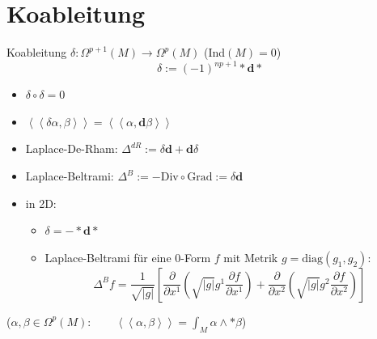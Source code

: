\documentclass{beamer}
\renewcommand{\d}{\textbf{d}}
\newcommand{\ablx}[2]{\frac{\partial #1}{\partial x^{#2}}}
\begin{document}
  
  
  \section{Koableitung}

  \begin{frame}
    \begin{block}{Koableitung \( \delta: \Omega^{p+1}(M) \longrightarrow \Omega^{p}(M) \) \qquad (Ind\( (M)=0 \))}
      \[ \delta := (-1)^{np+1} * \d * \]
      \begin{itemize}
        \item \( \delta\circ\delta = 0 \)
        \item \( \left\langle\left\langle \delta\alpha , \beta \right\rangle\right\rangle = \left\langle\left\langle \alpha , \d\beta \right\rangle\right\rangle \)
        \item Laplace-De-Rham: \( \Delta^{dR} := \delta\d + \d\delta \)
        \item Laplace-Beltrami: \( \Delta^{B} := -\text{Div}\circ\text{Grad} := \delta\d \)
        \item in 2D:
              \begin{itemize}
                \item \( \delta = - * \d * \)
                \item Laplace-Beltrami für eine \( 0 \)-Form \( f \) mit Metrik \( g=\text{diag}(g_{1}, g_{2}) \):
                      \[ \Delta^{B}f = \frac{1}{\sqrt{|g|}} \left[ \ablx{}{1}\left( \sqrt{|g|}g^{1}\ablx{f}{1}\right) +  \ablx{}{2}\left( \sqrt{|g|}g^{2}\ablx{f}{2}\right)\right] \]
              \end{itemize}
      \end{itemize}
    \end{block}
    (\( \alpha,\beta \in \Omega^{p}(M): \qquad \left\langle\left\langle \alpha , \beta \right\rangle\right\rangle = \int_{M}\alpha\wedge *\beta\))
  \end{frame}
\end{document}
